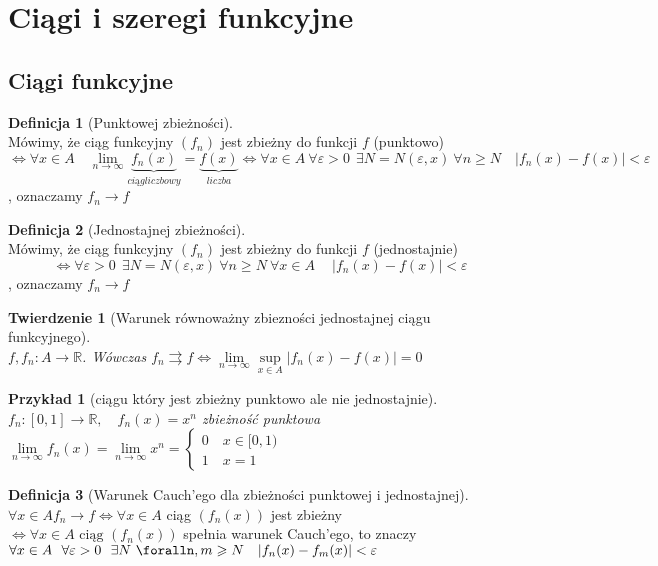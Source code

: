 \documentclass[12pt,a4paper]{article}
\newtheorem{tw}{Twierdzenie}
\newtheorem{przyklad}{Przykład}
\theoremstyle{definition}
\newtheorem{df}{Definicja}
\begin{document}




\section{Ciągi i szeregi funkcyjne}
\subsection{Ciągi funkcyjne}
\begin{df}[Punktowej zbieżności]~\\
Mówimy, że ciąg funkcyjny $(f_n)$ jest zbieżny do funkcji $f$ (punktowo)
 $$\Leftrightarrow \forall x\in A \quad \lim\limits_{n\to\infty}\underbrace{f_n(x)}_{ciąg liczbowy} = \underbrace{f(x)}_{liczba} \Leftrightarrow \forall x\in A ~ \forall\varepsilon > 0 ~~ \exists N = N(\varepsilon, x) ~ \forall n \geqslant N \quad |f_n(x)-f(x)| < \varepsilon$$, oznaczamy $f_n \rightarrow f$
\end{df}

\begin{df}[Jednostajnej zbieżności]~\\
Mówimy, że ciąg funkcyjny $(f_n)$ jest zbieżny do funkcji $f$ (jednostajnie) $$\Leftrightarrow \forall\varepsilon > 0 ~~ \exists N = N(\varepsilon, x) ~ \forall n \geqslant N ~ \forall x\in A ~ \quad |f_n(x)-f(x)| < \varepsilon$$, oznaczamy $f_n \rightarrow f$
\end{df}

\begin{tw}[Warunek równoważny zbiezności jednostajnej ciągu funkcyjnego]~\\
$f, f_n: A \to \mathbb{R}$. Wówczas $f_n \rightrightarrows f \Leftrightarrow \lim\limits_{n\to\infty} \sup\limits_{x\in A} |f_n(x)-f(x)| = 0$
\end{tw}

\begin{przyklad}[ciągu który jest zbieżny punktowo ale nie jednostajnie]
$f_n: [0,1] \to \mathbb{R}, \quad f_n(x) = x^n$ zbieżność punktowa
$
	\lim\limits_{n\to\infty}f_n(x) = \lim\limits_{n\to\infty}x^n = 
	\begin{cases}
	0 \quad x\in[0,1)\\
	1 \quad x=1
	\end{cases}
$
\end{przyklad}

\begin{df}[Warunek Cauch'ego dla zbieżności punktowej i jednostajnej]~\\
$\forall x\in A f_n \rightarrow f \Leftrightarrow \forall x\in A$ ciąg $(f_n(x))$ jest zbieżny $\Leftrightarrow \forall x\in A \mbox{ ciąg } (f_n(x))$ spełnia warunek Cauch'ego, to znaczy 
$\forall x\in A ~~ \forall \varepsilon>0 ~~ \exists N ~ \foralln,m \geqslant N \quad |f_n(x) - f_m(x)| < \varepsilon$ 
\end{df}
\end{document}
